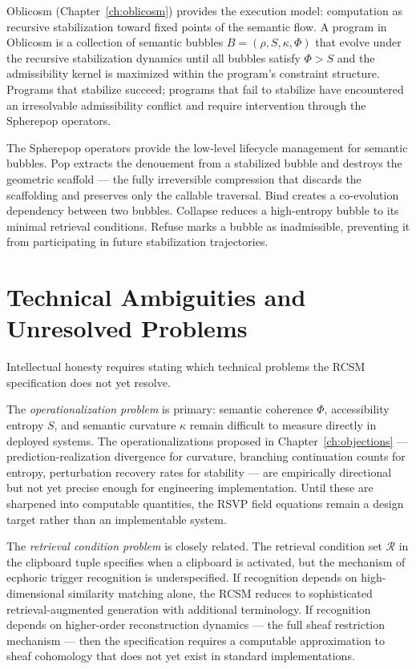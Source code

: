 \documentclass[12pt,oneside]{book}
\theoremstyle{plain}
\theoremstyle{definition}
\theoremstyle{plain}
\newcommand{\cR}{\mathcal{R}}
\begin{document}
Oblicosm (Chapter~\ref{ch:oblicosm}) provides the execution model: computation as recursive stabilization toward fixed points of the semantic flow. A program in Oblicosm is a collection of semantic bubbles $B = (\rho, S, \kappa, \Phi)$ that evolve under the recursive stabilization dynamics until all bubbles satisfy $\Phi > S$ and the admissibility kernel is maximized within the program's constraint structure. Programs that stabilize succeed; programs that fail to stabilize have encountered an irresolvable admissibility conflict and require intervention through the Spherepop operators.

The Spherepop operators provide the low-level lifecycle management for semantic bubbles. Pop extracts the denouement from a stabilized bubble and destroys the geometric scaffold — the fully irreversible compression that discards the scaffolding and preserves only the callable traversal. Bind creates a co-evolution dependency between two bubbles. Collapse reduces a high-entropy bubble to its minimal retrieval conditions. Refuse marks a bubble as inadmissible, preventing it from participating in future stabilization trajectories.

\section{Technical Ambiguities and Unresolved Problems}

Intellectual honesty requires stating which technical problems the RCSM specification does not yet resolve.

The \emph{operationalization problem} is primary: semantic coherence $\Phi$, accessibility entropy $S$, and semantic curvature $\kappa$ remain difficult to measure directly in deployed systems. The operationalizations proposed in Chapter~\ref{ch:objections} — prediction-realization divergence for curvature, branching continuation counts for entropy, perturbation recovery rates for stability — are empirically directional but not yet precise enough for engineering implementation. Until these are sharpened into computable quantities, the RSVP field equations remain a design target rather than an implementable system.

The \emph{retrieval condition problem} is closely related. The retrieval condition set $\cR$ in the clipboard tuple specifies when a clipboard is activated, but the mechanism of ecphoric trigger recognition is underspecified. If recognition depends on high-dimensional similarity matching alone, the RCSM reduces to sophisticated retrieval-augmented generation with additional terminology. If recognition depends on higher-order reconstruction dynamics — the full sheaf restriction mechanism — then the specification requires a computable approximation to sheaf cohomology that does not yet exist in standard implementations.
\end{document}
